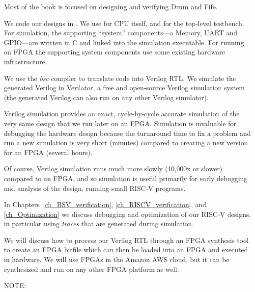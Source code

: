 \vspace{1ex}


Most of the book is focused on designing and verifying Drum and Fife.

We code our designs in {\BSV}.  We use {\BSV} for CPU itself, and for the
top-level testbench.  For simulation, the supporting ``system''
components---a Memory, UART and GPIO---are written in C and linked
into the simulation executable.  For running on FPGA the supporting
system components use some existing hardware infrastructure.

We use the \emph{bsc} compiler to translate {\BSV} code into Verilog RTL.
We simulate the generated Verilog in Verilator, a free and open-source
Verilog simulation system (the generated Verilog can also run on any
other Verilog simulator).

Verilog simulation provides an exact, cycle-by-cycle accurate
simulation of the very same design that we run later on an FPGA.
Simulation is invaluable for debugging the hardware design because the
turnaround time to fix a problem and run a new simulation is very
short (minutes) compared to creating a new version for an FPGA
(several hours).

Of course, Verilog simulation runs much more slowly (10,000x or
slower) compared to an FPGA, and so simulation is useful primarily for
early debugging and analysis of the design, running small RISC-V
programs.

In Chapters~\ref{ch_BSV_verification}, \ref{ch_RISCV_verification},
and \ref{ch_Optimization} we discuss debugging and optimization of our
RISC-V designs, in particular using \emph{traces} that are generated
during simulation.

We will discuss how to process our Verilog RTL through an FPGA
synthesis tool to create an FPGA bitfile which can then be loaded into
an FPGA and executed in hardware.  We will use FPGAs in the Amazon AWS
cloud, but it can be synthesized and run on any other FPGA platform as
well.

\vspace{1ex}

NOTE: 

